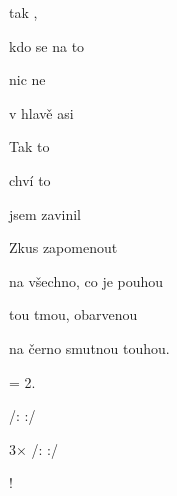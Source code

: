 

\zs
{} tak ,

kdo se  na to 

nic  ne

v hlavě  asi 
\ks

\zr
Tak   to 

 chví  to 

 jsem  zavinil  
\kr

\zs
Zkus zapomenout

na všechno, co je pouhou

tou tmou, obarvenou

na černo smutnou touhou.
\ks

\zr  \kr

\zs
= 2.
\ks

\zr  \kr

/:     :/

3× /:     :/

!

\kp





